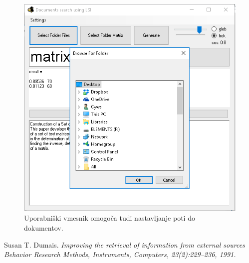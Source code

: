 \documentclass{article}
\begin{document}
\begin{figure}[h]
 \centering
    \includegraphics[width=.8\linewidth]{browseDialog}
    \caption{Uporabniški vmesnik omogoča tudi nastavljanje poti do dokumentov.}
    \label{slika:UI4}
\end{figure}


\begin{thebibliography}{9}
Susan T. Dumais. 
\textit{ Improving the retrieval of information from external sources Behavior Research Methods, Instruments,  Computers, 23(2):229–236, 1991.}
\end{thebibliography}
\end{document}
